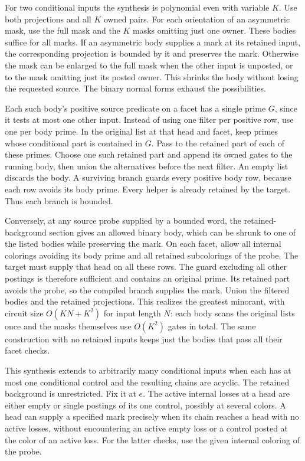 For two conditional inputs the synthesis is
polynomial even with variable $K$. Use both
projections and all $K$ owned pairs. For each
orientation of an asymmetric mask, use the
full mask and the $K$ masks omitting just one
owner. These bodies suffice for all marks.
If an asymmetric body supplies a mark at its
retained input, the corresponding projection
is bounded by it and preserves the mark.
Otherwise the mask can be enlarged to the
full mask when the other input is unposted,
or to the mask omitting just its posted
owner. This shrinks the body without losing
the requested source. The binary normal forms
exhaust the possibilities.

Each such body's positive source predicate
on a facet has a single prime $G$, since it
tests at most one other input. Instead of
using one filter per positive row, use one
per body prime. In the original list at that
head and facet, keep primes whose conditional
part is contained in $G$. Pass to the
retained part of each of these primes.
Choose one such retained part and append its
owned gates to the running body, then union
the alternatives before the next filter.
An empty list discards the body. A surviving
branch guards every positive body row,
because each row avoids its body prime.
Every helper is already retained by the
target. Thus each branch is bounded.

Conversely, at any source probe supplied by
a bounded word, the retained-background
section gives an allowed binary body, which
can be shrunk to one of the listed bodies
while preserving the mark. On each facet,
allow all internal colorings avoiding its
body prime and all retained subcolorings
of the probe. The target must supply that
head on all these rows. The guard excluding
all other postings is therefore sufficient
and contains an original prime. Its retained
part avoids the probe, so the compiled
branch supplies the mark. Union the filtered
bodies and the retained projections. This
realizes the greatest minorant, with circuit
size $O(KN+K^2)$ for input length $N$:
each body scans the original lists once and
the masks themselves use $O(K^2)$ gates
in total. The same construction with no
retained inputs keeps just the bodies that
pass all their facet checks.

This synthesis extends to arbitrarily many conditional
inputs when each has at most one conditional control
and the resulting chains are acyclic. The retained
background is unrestricted. Fix it at $e$. The active
internal losses at a head are either empty or single
postings of its one control, possibly at several
colors. A head can supply a specified mark precisely
when its chain reaches a head with no active losses,
without encountering an active empty loss or a
control posted at the color of an active loss.
For the latter checks, use the given internal
coloring of the probe.

